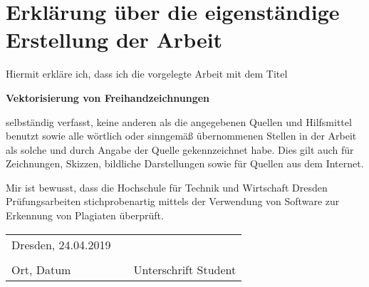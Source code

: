 \renewcommand*\chapterpagestyle{empty}
\chapter*{Erklärung über die eigenständige Erstellung der Arbeit}

Hiermit erkläre ich, dass ich die vorgelegte Arbeit mit dem Titel

\begin{center}
	\bfseries
	Vektorisierung von Freihandzeichnungen
\end{center}

selbständig verfasst, keine anderen als die angegebenen Quellen und Hilfsmittel benutzt sowie alle wörtlich oder sinngemäß übernommenen Stellen in der Arbeit als solche und durch Angabe der Quelle gekennzeichnet habe.
Dies gilt auch für Zeichnungen, Skizzen, bildliche Darstellungen sowie für Quellen aus dem Internet.

Mir ist bewusst, dass die Hochschule für Technik und Wirtschaft Dresden Prüfungsarbeiten stichprobenartig mittels der Verwendung von Software zur Erkennung von Plagiaten überprüft.

\vspace{2cm}
\begin{tabu}{X[3]X[1]X[3]}
	Dresden, 24.04.2019 & & \\[-8bp]
	\hrulefill{} & & \hrulefill{} \\
	Ort, Datum & & Unterschrift Student
\end{tabu}
